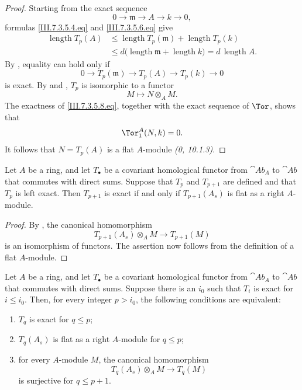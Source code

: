 \begin{proof}
Starting from the exact sequence
\[
  0\longrightarrow\mathfrak m
  \longrightarrow A
  \longrightarrow k
  \longrightarrow0,
\]
formulas \eqref{III.7.3.5.4.eq} and
\eqref{III.7.3.5.6.eq} give
\[
  \begin{split}
  \operatorname{length}T_p(A)
  &\leq
  \operatorname{length}T_p(\mathfrak m)
  +
  \operatorname{length}T_p(k)
  \\
  &\leq
  d\bigl(
    \operatorname{length}\mathfrak m
    +
    \operatorname{length}k
  \bigr)
  =
  d\,\operatorname{length}A.
  \end{split}
\]
By , equality can hold only if
\[
  0\longrightarrow T_p(\mathfrak m)
  \longrightarrow T_p(A)
  \longrightarrow T_p(k)
  \longrightarrow0
  \tag{7.3.5.8}\label{III.7.3.5.8.eq}
\]
is exact.  By  and , $T_p$ is
isomorphic to a functor
\[
  M\longmapsto N\otimes_A M.
\]
The exactness of \eqref{III.7.3.5.8.eq}, together with the exact
sequence of $\Tor$, shows that
\[
  \Tor^A_1(N,k)=0.
\]
It follows that $N=T_p(A)$ is a flat $A$-module
\emph{(0, 10.1.3)}.
\end{proof}

\begin{lemma}[7.3.6]
\label{III.7.3.6}
Let $A$ be a ring, and let $T_\bullet$ be a covariant
homological functor from $\cat{Ab}_A$ to $\cat{Ab}$ that
commutes with direct sums.  Suppose that $T_p$ and $T_{p+1}$
are defined and that $T_p$ is left exact.  Then $T_{p+1}$ is
exact if and only if $T_{p+1}(A_s)$ is flat as a right
$A$-module.
\end{lemma}

\begin{proof}
By , the canonical homomorphism
\[
  T_{p+1}(A_s)\otimes_A M
  \longrightarrow
  T_{p+1}(M)
\]
is an isomorphism of functors.  The assertion now follows from
the definition of a flat $A$-module.
\end{proof}

\begin{proposition}[7.3.7]
\label{III.7.3.7}
Let $A$ be a ring, and let $T_\bullet$ be a covariant
homological functor from $\cat{Ab}_A$ to $\cat{Ab}$ that
commutes with direct sums.  Suppose there is an $i_0$ such that
$T_i$ is exact for $i\leq i_0$.  Then, for every integer
$p>i_0$, the following conditions are equivalent:
\begin{enumerate}
  \item[(a)] $T_q$ is exact for $q\leq p$;
  \item[(b)] $T_q(A_s)$ is flat as a right $A$-module for
    $q\leq p$;
  \item[(c)] for every $A$-module $M$, the canonical
    homomorphism
    \[
      T_q(A_s)\otimes_A M
      \longrightarrow
      T_q(M)
    \]
    is surjective for $q\leq p+1$.
\end{enumerate}
\end{proposition}

